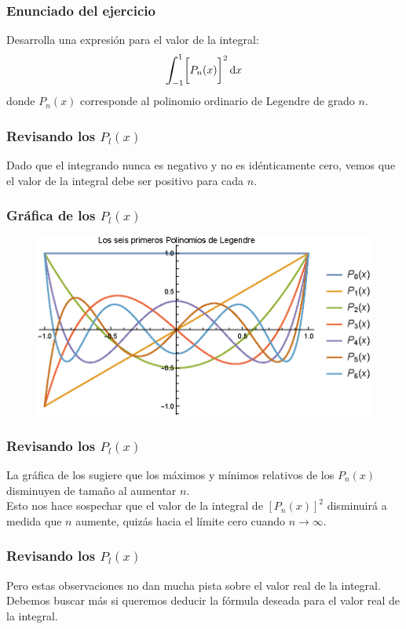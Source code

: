 \documentclass[12pt]{beamer}
\begin{document}
\begin{frame}
\frametitle{Enunciado del ejercicio}
Desarrolla una expresión para el valor de la integral:
\pause
\begin{align*}
\scaleint{6ex}_{\bs -1}^{1} \bigg[ P_{n}(x) \bigg]^{2} \dd{x}
\end{align*}
donde $P_{n}(x)$ corresponde al polinomio ordinario de Legendre de grado $n$.
\end{frame}
\begin{frame}
\frametitle{Revisando los $P_{l}(x)$}
Dado que el integrando nunca es negativo y no es idénticamente cero, vemos que el valor de la integral debe ser positivo para cada $n$.
\end{frame}
\begin{frame}
\frametitle{Gráfica de los $P_{l}(x)$}
\begin{figure}
    \centering
    \includegraphics[scale=0.95]{Imagenes/Plot_Lagrange_0-6.eps}
\end{figure}
\end{frame}
\begin{frame}
\frametitle{Revisando los $P_{l}(x)$}
La gráfica de los  sugiere que los máximos y mínimos relativos de los $P_{n} (x)$ disminuyen de tamaño al aumentar $n$.
\\
\bigskip
\pause
Esto nos hace sospechar que el valor de la integral de $[P_{n} (x)]^{2}$ disminuirá a medida que $n$ aumente, quizás hacia el límite cero cuando $n  \to \infty$.
\end{frame}
\begin{frame}
\frametitle{Revisando los $P_{l}(x)$}
Pero estas observaciones no dan mucha pista sobre el valor real de la integral.
\\
\bigskip
\pause
Debemos buscar más si queremos deducir la fórmula deseada para el valor real de la integral.
\end{frame}
\end{document}
